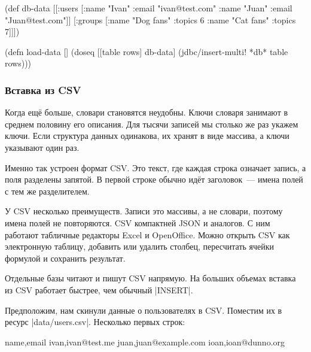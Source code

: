 \begin{english}
  \begin{clojure}
(def db-data
  [[:users [{:name "Ivan" :email "ivan@test.com"}
            {:name "Juan" :email "Juan@test.com"}]]
   [:groups [{:name "Dog fans" :topics 6}
             {:name "Cat fans" :topics 7}]]])

(defn load-data []
  (doseq [[table rows] db-data]
    (jdbc/insert-multi! *db* table rows)))
  \end{clojure}
\end{english}

\subsubsection*{Вставка из CSV}


Когда ещ\"{е} больше, словари становятся неудобны. Ключи словаря занимают в
среднем половину его описания. Для тысячи записей мы столько же раз укажем
ключи. Если структура данных одинакова, их хранят в виде массива, а ключи
указывают один раз.

Именно так устроен формат CSV.
Это текст, где каждая строка означает запись, а поля разделены запятой.
В первой строке обычно ид\"{е}т заголовок~--- имена полей с тем же разделителем.

У CSV несколько преимуществ. Записи это массивы, а не словари, поэтому имена
полей не повторяются. CSV компактней JSON и аналогов. С ним работают табличные
редакторы Excel и OpenOffice. Можно открыть CSV как электронную таблицу,
добавить или удалить столбец, пересчитать ячейки формулой и сохранить результат.


Отдельные базы читают и пишут CSV напрямую. На больших объемах вставка из CSV
работает быстрее, чем обычный \spverb|INSERT|.

Предположим, нам скинули данные о пользователях в CSV. Поместим их в ресурс
\spverb|data/users.csv|. Несколько первых строк:

\begin{english}
  \begin{text}
name,email
ivan,ivan@test.me
juan,juan@example.com
ioan,ioan@dunno.org
  \end{text}
\end{english}


